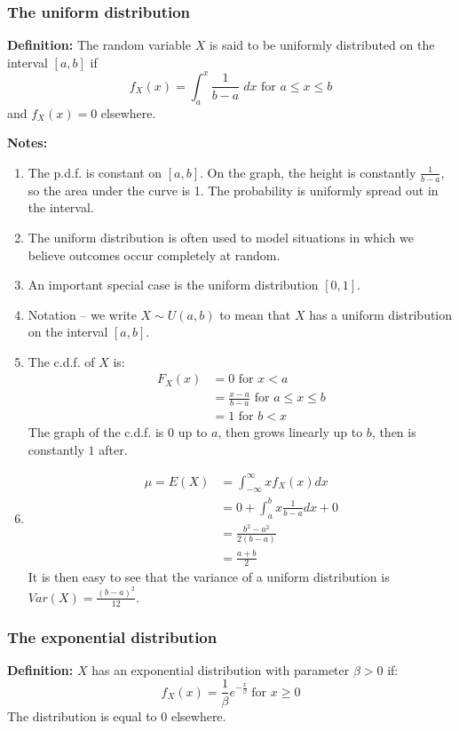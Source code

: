 \documentclass[12pt]{article}
\begin{document}
\subsubsection{The uniform distribution}
\textbf{Definition:} The random variable $X$ is said to be uniformly distributed on the interval $[a,b]$ if
\[
    f_X (x) = \int_a^x \frac{1}{b-a} \; dx \text{ for } a \leq x \leq b
\]
and $f_X (x) = 0$ elsewhere.

\textbf{Notes:}
\begin{enumerate}
    \item The p.d.f. is constant on $[a,b]$. On the graph, the height is constantly $\frac{1}{b-a}$, so the area under the curve is 1. The probability is uniformly spread out in the interval.
    \item The uniform distribution is often used to model situations in which we believe outcomes occur completely at random.
    \item An important special case is the uniform distribution $[0,1]$.
    \item Notation -- we write $X \sim U(a,b)$ to mean that $X$ has a uniform distribution on the interval $[a,b]$.
    \item The c.d.f. of $X$ is:
        \begin{align*}
            F_X (x) &= 0 \text{ for } x < a \\
                &= \frac{x-a}{b-a} \text{ for } a \leq x \leq b \\
                &= 1 \text{ for } b < x
        \end{align*}
        The graph of the c.d.f. is $0$ up to $a$, then grows linearly up to $b$, then is constantly $1$ after.
    \item
        \begin{align*}
            \mu = E(X) &= \int_{-\infty}^{\infty} x f_X (x) dx \\
                &= 0 + \int_a^b x \frac{1}{b-a} dx + 0 \\
                &= \frac{b^2 -a^2}{2(b-a)} \\
                &= \frac{a+b}{2}
        \end{align*}
        It is then easy to see that the variance of a uniform distribution is $Var(X) = \frac{(b-a)^2}{12}$.
\end{enumerate}

\subsubsection{The exponential distribution}
\textbf{Definition:} $X$ has an exponential distribution with parameter $\beta > 0$ if:
\[
    f_X (x) = \frac{1}{\beta} e^{- \frac{x}{\beta}} \; \text{for } x \geq 0
\]
The distribution is equal to $0$ elsewhere.
\end{document}
